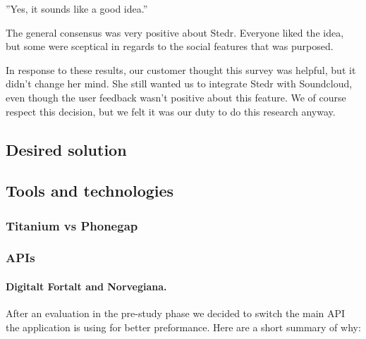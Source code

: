 	”Yes, it sounds like a good idea.”


	The general consensus was very positive about Stedr. Everyone liked the idea, but some were sceptical in regards to the social features that was purposed.

	In response to these results, our customer thought this survey was helpful, but it didn't change her mind. She still wanted us to integrate Stedr with Soundcloud, even though the user feedback wasn't positive about this feature. We of course respect this decision, but we felt it was our duty to do this research anyway.
	
	\subsection{Desired solution}
	
	
	\subsection{Tools and technologies}
		\subsubsection{Titanium vs Phonegap}
		\subsubsection{APIs}

\paragraph{Digitalt Fortalt and Norvegiana.}
After an evaluation in the pre-study phase we decided to switch the main API the application is using for better preformance. Here are a short summary of why:\\[4pt]

